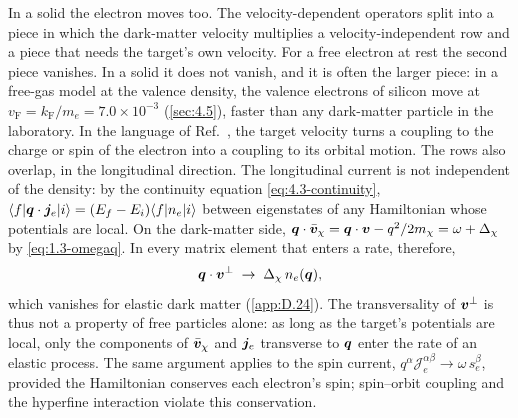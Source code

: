 In a solid the electron moves too. The velocity-dependent operators split into a piece in which the dark-matter velocity multiplies a velocity-independent row and a piece that needs the target's own velocity. For a free electron at rest the second piece vanishes. In a solid it does not vanish, and it is often the larger piece: in a free-gas model at the valence density, the valence electrons of silicon move at $v_{\mathrm{F}} = k_{\mathrm{F}}/m_e = 7.0\times10^{-3}$ (\cref{sec:4.5}), faster than any dark-matter particle in the laboratory. In the language of Ref.~\cite[Table~III]{trickle2022effective}, the target velocity turns a coupling to the charge or spin of the electron into a coupling to its orbital motion. The rows also overlap, in the longitudinal direction. The longitudinal current is not independent of the density: by the continuity equation \cref{eq:4.3-continuity}, $\langle f|\bm{q}\cdot\bm{j}_e|i\rangle = (E_f - E_i)\langle f|n_e|i\rangle$ between eigenstates of any Hamiltonian whose potentials are local. On the dark-matter side, $\bm{q}\cdot\bar{\bm{v}}_\chi = \bm{q}\cdot\bm{v} - q^2/2m_{\chi} = \omega + \Delta_\chi$ by \cref{eq:1.3-omegaq}. In every matrix element that enters a rate, therefore,
\begin{equation}
  \bm{q}\cdot\bm{v}^\perp \;\to\; \Delta_\chi\,n_e(\bm{q}) ,
  \label{eq:8.1-transverse}
\end{equation}
which vanishes for elastic dark matter (\cref{app:D.24}). The transversality of $\bm{v}^\perp$ is thus not a property of free particles alone: as long as the target's potentials are local, only the components of $\bar{\bm{v}}_\chi$ and $\bm{j}_e$ transverse to $\bm{q}$ enter the rate of an elastic process. The same argument applies to the spin current, $q^\alpha\mathcal{J}^{\alpha\beta}_e \to \omega\,s^\beta_e$, provided the Hamiltonian conserves each electron's spin; spin--orbit coupling and the hyperfine interaction violate this conservation.

